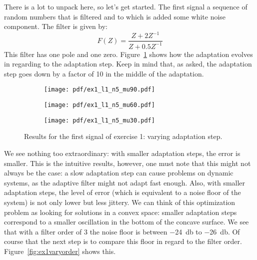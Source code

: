 There is a lot to unpack here, so let's get started. The first signal a sequence
of random numbers that is filtered and to which is added some white noise
component. The filter is given by:
\begin{equation}
    F(Z) = \frac{Z+2Z^{-1}}{Z+0.5Z^{-1}}
\end{equation}
This filter has one pole and one zero. Figure~\ref{fig:ex1varystep} shows how the
adaptation evolves in regarding to the adaptation step. Keep in mind that, as
asked, the adaptation step goes down by a factor of 10 in the middle of the
adaptation.
\begin{figure}
    \centering
    \begin{subfigure}[t]{0.32\columnwidth}
        \centering
        \texttt{[image: pdf/ex1\_l1\_n5\_mu90.pdf]}
        \caption{}
    \end{subfigure} \hfill
    \begin{subfigure}[t]{0.32\columnwidth}
        \centering
        \texttt{[image: pdf/ex1\_l1\_n5\_mu60.pdf]}
        \caption{}
    \end{subfigure} \hfill
    \begin{subfigure}[t]{0.32\columnwidth}
        \centering
        \texttt{[image: pdf/ex1\_l1\_n5\_mu30.pdf]}
        \caption{}
    \end{subfigure}
    \caption{Results for the first signal of exercise 1: varying adaptation
        step.\label{fig:ex1varystep}}
\end{figure}
We see nothing too extraordinary: with smaller adaptation steps, the error is
smaller. This is the intuitive results, however, one must note that this might not
always be the case: a slow adaptation step can cause problems on dynamic systems,
as the adaptive filter might not adapt fast enough. Also, with smaller adaptation
steps, the level of error (which is equivalent to a noise floor of the system) is
not only lower but less jittery. We can think of this optimization problem as
looking for solutions in a convex space: smaller adaptation steps correspond to a
smaller oscillation in the bottom of the concave surface. We see that with a
filter order of 3 the noise floor is between \SI{-24}{\decibel} to
\SI{-26}{\decibel}. Of course that the next step is to compare this floor in
regard to the filter order. Figure~\ref{fig:ex1varyorder} shows this.
